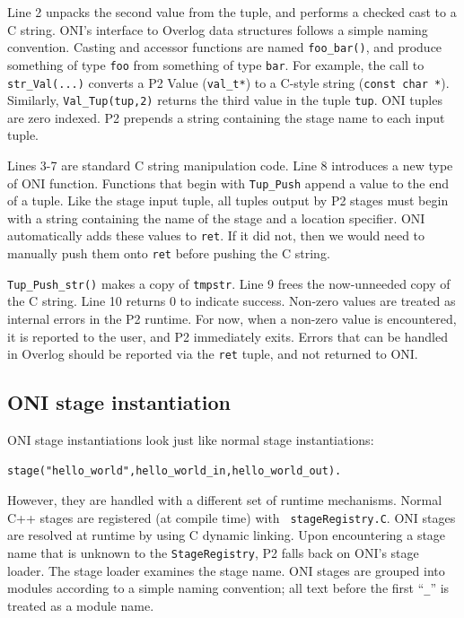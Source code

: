 \documentclass{article}
\begin{document}
Line 2 unpacks the second value from the tuple, and performs a checked
cast to a C string.  ONI's interface to Overlog data structures
follows a simple naming convention.  Casting and accessor functions
are named {\tt foo\_bar()}, and produce something of type {\tt foo}
from something of type {\tt bar}.  For example, the call to {\tt
  str\_Val(...)} converts a P2 Value ({\tt val\_t*}) to a C-style
string ({\tt const char *}).  Similarly, {\tt Val\_Tup(tup,2)} returns
the third value in the tuple {\tt tup}.  ONI tuples are zero indexed.
P2 prepends a string containing the stage name to each input tuple.

Lines 3-7 are standard C string manipulation code.  Line 8 introduces
a new type of ONI function.  Functions that begin with {\tt Tup\_Push}
append a value to the end of a tuple.  Like the stage input tuple, all
tuples output by P2 stages must begin with a string containing the
name of the stage and a location specifier.  ONI automatically adds
these values to {\tt ret}.  If it did not, then we would need to
manually push them onto {\tt ret} before pushing the C string.

{\tt Tup\_Push\_str()} makes a copy of {\tt tmpstr}.  Line 9 frees the
now-unneeded copy of the C string.  Line 10 returns 0 to indicate
success.  Non-zero values are treated as internal errors in the P2
runtime.  For now, when a non-zero value is encountered, it is
reported to the user, and P2 immediately exits.  Errors that can be
handled in Overlog should be reported via the {\tt ret} tuple, and not
returned to ONI.

\subsection{ONI stage instantiation}
ONI stage instantiations look just like normal stage instantiations:
\begin{lstlisting}
stage("hello_world",hello_world_in,hello_world_out).
\end{lstlisting}
However, they are handled with a different set of runtime mechanisms.
Normal C++ stages are registered (at compile time) with {\tt
  stageRegistry.C}.  ONI stages are resolved at runtime by using C
dynamic linking.  Upon encountering a stage name that is unknown to
the {\tt StageRegistry}, P2 falls back on ONI's stage loader.  The
stage loader examines the stage name.  ONI stages are grouped into
modules according to a simple naming convention; all text before the
first ``{\tt\_}'' is treated as a module name.
\end{document}
